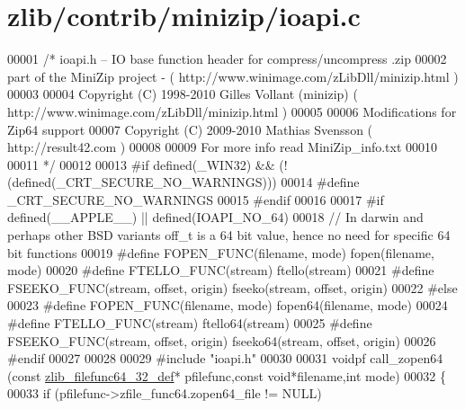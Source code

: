 \hypertarget{zlib_2contrib_2minizip_2ioapi_8c_source}{}\section{zlib/contrib/minizip/ioapi.c}
\label{zlib_2contrib_2minizip_2ioapi_8c_source}

\begin{DoxyCode}
00001 \textcolor{comment}{/* ioapi.h -- IO base function header for compress/uncompress .zip}
00002 \textcolor{comment}{   part of the MiniZip project - ( http://www.winimage.com/zLibDll/minizip.html )}
00003 \textcolor{comment}{}
00004 \textcolor{comment}{         Copyright (C) 1998-2010 Gilles Vollant (minizip) ( http://www.winimage.com/zLibDll/minizip.html )}
00005 \textcolor{comment}{}
00006 \textcolor{comment}{         Modifications for Zip64 support}
00007 \textcolor{comment}{         Copyright (C) 2009-2010 Mathias Svensson ( http://result42.com )}
00008 \textcolor{comment}{}
00009 \textcolor{comment}{         For more info read MiniZip\_info.txt}
00010 \textcolor{comment}{}
00011 \textcolor{comment}{*/}
00012 
00013 \textcolor{preprocessor}{#if defined(\_WIN32) && (!(defined(\_CRT\_SECURE\_NO\_WARNINGS)))}
00014 \textcolor{preprocessor}{        #define \_CRT\_SECURE\_NO\_WARNINGS}
00015 \textcolor{preprocessor}{#endif}
00016 
00017 \textcolor{preprocessor}{#if defined(\_\_APPLE\_\_) || defined(IOAPI\_NO\_64)}
00018 \textcolor{comment}{// In darwin and perhaps other BSD variants off\_t is a 64 bit value, hence no need for specific 64 bit
       functions}
00019 \textcolor{preprocessor}{#define FOPEN\_FUNC(filename, mode) fopen(filename, mode)}
00020 \textcolor{preprocessor}{#define FTELLO\_FUNC(stream) ftello(stream)}
00021 \textcolor{preprocessor}{#define FSEEKO\_FUNC(stream, offset, origin) fseeko(stream, offset, origin)}
00022 \textcolor{preprocessor}{#else}
00023 \textcolor{preprocessor}{#define FOPEN\_FUNC(filename, mode) fopen64(filename, mode)}
00024 \textcolor{preprocessor}{#define FTELLO\_FUNC(stream) ftello64(stream)}
00025 \textcolor{preprocessor}{#define FSEEKO\_FUNC(stream, offset, origin) fseeko64(stream, offset, origin)}
00026 \textcolor{preprocessor}{#endif}
00027 
00028 
00029 \textcolor{preprocessor}{#include "ioapi.h"}
00030 
00031 voidpf call\_zopen64 (\textcolor{keyword}{const} \hyperlink{structzlib__filefunc64__32__def__s}{zlib\_filefunc64\_32\_def}* pfilefunc,\textcolor{keyword}{const} \textcolor{keywordtype}{void}*filename,\textcolor{keywordtype}{int} 
      mode)
00032 \{
00033     \textcolor{keywordflow}{if} (pfilefunc->zfile\_func64.zopen64\_file != NULL)

\end{DoxyCode}
